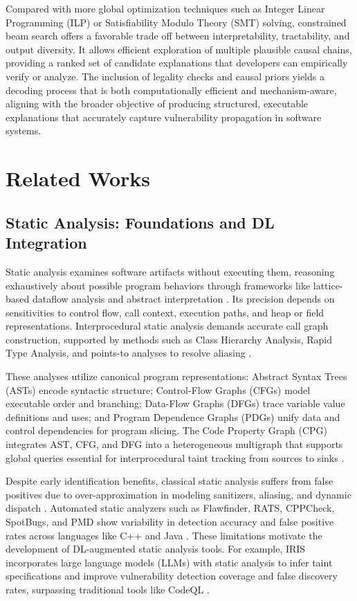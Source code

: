 \documentclass{buthesis}
\begin{document}
Compared with more global optimization techniques such as Integer Linear Programming (ILP) or Satisfiability Modulo Theory (SMT) solving, constrained beam search offers a favorable trade off between interpretability, tractability, and output diversity. It allows efficient exploration of multiple plausible causal chains, providing a ranked set of candidate explanations that developers can empirically verify or analyze. The inclusion of legality checks and causal priors yields a decoding process that is both computationally efficient and mechanism-aware, aligning with the broader objective of producing structured, executable explanations that accurately capture vulnerability propagation in software systems.


\section{Related Works}

\subsection{Static Analysis: Foundations and DL Integration}

Static analysis examines software artifacts without executing them, reasoning exhaustively about possible program behaviors through frameworks like lattice-based dataflow analysis and abstract interpretation \cite{yamaguchi2014cpg, Chakraborty2020}. Its precision depends on sensitivities to control flow, call context, execution paths, and heap or field representations. Interprocedural static analysis demands accurate call graph construction, supported by methods such as Class Hierarchy Analysis, Rapid Type Analysis, and points-to analyses to resolve aliasing \cite{Xia2023, Liu2020}.

These analyses utilize canonical program representations: Abstract Syntax Trees (ASTs) encode syntactic structure; Control-Flow Graphs (CFGs) model executable order and branching; Data-Flow Graphs (DFGs) trace variable value definitions and uses; and Program Dependence Graphs (PDGs) unify data and control dependencies for program slicing. The Code Property Graph (CPG) integrates AST, CFG, and DFG into a heterogeneous multigraph that supports global queries essential for interprocedural taint tracking from sources to sinks \cite{yamaguchi2014cpg}.

Despite early identification benefits, classical static analysis suffers from false positives due to over-approximation in modeling sanitizers, aliasing, and dynamic dispatch \cite{Ruiz2023, Marchetto2024}. Automated static analyzers such as Flawfinder, RATS, CPPCheck, SpotBugs, and PMD show variability in detection accuracy and false positive rates across languages like C++ and Java \cite{Kaur2020comparative}. These limitations motivate the development of DL-augmented static analysis tools. For example, IRIS incorporates large language models (LLMs) with static analysis to infer taint specifications and improve vulnerability detection coverage and false discovery rates, surpassing traditional tools like CodeQL \cite{Li2024IRIS}.
\end{document}
